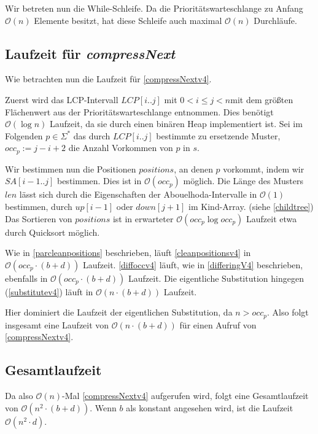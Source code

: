 Wir betreten nun die While-Schleife. Da die Prioritätswarteschlange zu Anfang $\mathcal{O}(n)$ Elemente besitzt, hat diese Schleife auch maximal $\mathcal{O}(n)$ Durchläufe.

\subsection{Laufzeit für \emph{compressNext}}

Wie betrachten nun die Laufzeit für \autoref{compressNextv4}.

Zuerst wird das LCP-Intervall $LCP[i..j]$ mit $0 < i \leq j < n$mit dem größten Flächenwert aus der Prioritätswarteschlange entnommen. Dies benötigt $\mathcal{O}(\log n)$ Laufzeit, da sie durch einen binären Heap implementiert ist.
Sei im Folgenden $p \in \Sigma^*$ das durch $LCP[i..j]$ bestimmte zu ersetzende Muster, $occ_p := j - i + 2$ die Anzahl Vorkommen von $p$ in $s$.  

Wir bestimmen nun die Positionen $positions$, an denen $p$ vorkommt, indem wir $SA[i-1..j]$ bestimmen. Dies ist in $\mathcal{O}(occ_p)$ möglich.
Die Länge des Musters $len$ lässt sich durch die Eigenschaften der Abouelhoda-Intervalle in $\mathcal{O}(1)$ bestimmen, durch $up[i-1]$ oder $down[j+1]$ im Kind-Array. (siehe \autoref{childtree})
Das Sortieren von $positions$ ist in erwarteter $\mathcal{O}(occ_p \log occ_p)$ Laufzeit etwa durch Quicksort möglich.

Wie in \autoref{parcleanpositions} beschrieben, läuft \autoref{cleanpositionsv4} in $\mathcal{O}(occ_p \cdot (b + d))$ Laufzeit.
\autoref{diffoccv4} läuft, wie in \autoref{differingV4} beschrieben, ebenfalls in $\mathcal{O}(occ_p \cdot (b + d))$ Laufzeit.
Die eigentliche Substitution hingegen (\autoref{substitutev4}) läuft in $\mathcal{O}(n \cdot (b + d))$ Laufzeit.

Hier dominiert die Laufzeit der eigentlichen Substitution, da $n > occ_p$.
Also folgt insgesamt eine Laufzeit von $\mathcal{O}(n \cdot (b + d))$ für einen Aufruf von \autoref{compressNextv4}.

\subsection{Gesamtlaufzeit}

Da also $\mathcal{O}(n)$-Mal \autoref{compressNextv4} aufgerufen wird, folgt eine Gesamtlaufzeit von $\mathcal{O}(n^2 \cdot (b + d))$. Wenn $b$ als konstant angesehen wird, ist die Laufzeit $\mathcal{O}(n^2 \cdot d)$.


